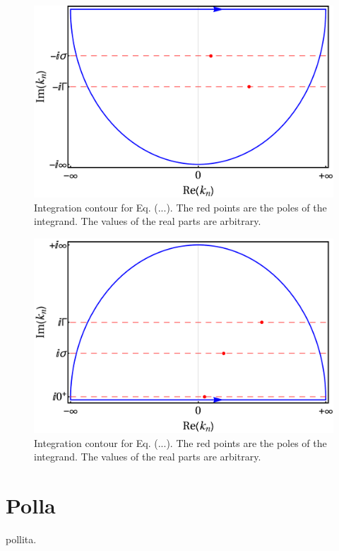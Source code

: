 \documentclass[aps,pra,reprint,amsmath,amssymb]{revtex4-1}
\begin{document}
\appendix

\begin{figure}
\includegraphics[scale=0.25]{lower_contour.pdf}
\caption{Integration contour for Eq. (...). The red points are the poles of the
integrand. The values of the real parts are arbitrary.}
\end{figure}

\begin{figure}
\includegraphics[scale=0.25]{upper_contour.pdf}
\caption{Integration contour for Eq. (...). The red points are the poles of the
integrand. The values of the real parts are arbitrary.}
\end{figure}


\section{Polla}

pollita.




\end{document}
